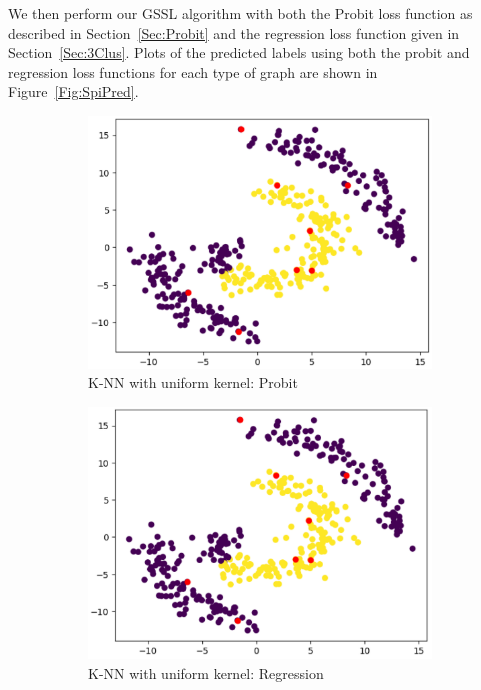 \documentclass[12pt]{amsart}
\begin{document}
We then perform our GSSL algorithm with both the Probit loss function as described in Section~\ref{Sec:Probit} and the regression loss function given in Section~\ref{Sec:3Clus}. Plots of the predicted labels using both the probit and regression loss functions for each type of graph are shown in Figure~\ref{Fig:SpiPred}.
    \begin{figure}[ht] 
  \begin{subfigure}{0.475\linewidth}
    \centering
    \includegraphics[width=0.8\linewidth]{Figures/SpiKNNUniPro.png} 
    \caption{K-NN with uniform kernel: Probit} 
    \label{Fig:SpiKNNUniPro} 
  \end{subfigure}%
  \begin{subfigure}{0.475\linewidth}
    \centering
    \includegraphics[width=0.8\linewidth]{Figures/SpiKNNUniReg.png} 
    \caption{K-NN with uniform kernel: Regression} 
    \label{Fig:SpiKNNUniReg} 
  \end{subfigure} 
    \begin{subfigure}{0.475\linewidth}
    \centering

\end{subfigure}
\end{figure}
\end{document}
